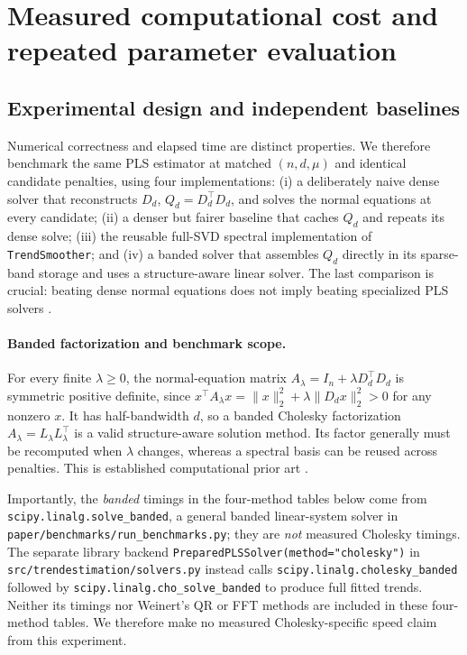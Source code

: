 \section{Measured computational cost and repeated parameter evaluation}
\subsection{Experimental design and independent baselines}
Numerical correctness and elapsed time are distinct properties. We
therefore benchmark the same PLS estimator at matched $(n,d,\mu)$
and identical candidate penalties, using four implementations:
(i) a deliberately naive dense solver that reconstructs $D_d$,
$Q_d=D_d^\top D_d$, and solves the normal equations at every
candidate; (ii) a denser but fairer baseline that caches $Q_d$ and
repeats its dense solve; (iii) the reusable full-SVD spectral
implementation of \texttt{TrendSmoother}; and (iv) a banded solver
that assembles $Q_d$ directly in its sparse-band storage and uses
a structure-aware linear solver. The last comparison is crucial:
beating dense normal equations does not imply beating specialized
PLS solvers \cite{weinert2007wh,weinert2012fast}.

\paragraph{Banded factorization and benchmark scope.}
For every finite $\lambda\geq0$, the normal-equation matrix
$A_\lambda=I_n+\lambda D_d^\top D_d$ is symmetric positive
definite, since $x^\top A_\lambda x=\|x\|_2^2+
\lambda\|D_dx\|_2^2>0$ for any nonzero $x$.
It has half-bandwidth $d$, so a banded Cholesky factorization
$A_\lambda=L_\lambda L_\lambda^\top$ is a valid
structure-aware solution method. Its factor generally must be
recomputed when $\lambda$ changes, whereas a spectral basis
can be reused across penalties. This is established computational
prior art \cite{weinert2007wh,weinert2012fast}.

Importantly, the \emph{banded} timings in the four-method
tables below come from \texttt{scipy.linalg.solve\_banded},
a general banded linear-system solver in
\texttt{paper/benchmarks/run\_benchmarks.py}; they are
\emph{not} measured Cholesky timings. The separate library
backend \texttt{PreparedPLSSolver(method="cholesky")} in
\texttt{src/trendestimation/solvers.py} instead calls
\texttt{scipy.linalg.cholesky\_banded} followed by
\texttt{scipy.linalg.cho\_solve\_banded} to produce full
fitted trends. Neither its timings nor Weinert's QR or FFT
methods are included in these four-method tables.
We therefore make no measured Cholesky-specific speed
claim from this experiment.

